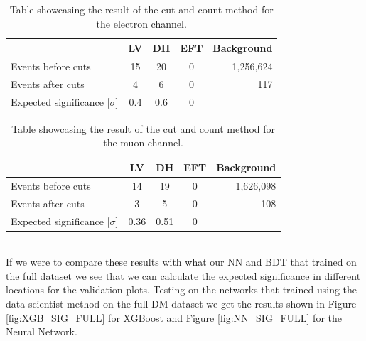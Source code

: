 \documentclass[14pt, a4paper]{book}
\begin{document}
\begin{table}[!h]
    \centering
    \begin{tabular}{l|c|c|c|r}\midrule\midrule
                                          & LV  & DH  & EFT & Background \\\midrule
         Events before cuts               & 15  & 20  & 0   & 1,256,624    \\
         Events after cuts                & 4   & 6   & 0   & 117 \\
         Expected significance [$\sigma$] & 0.4 & 0.6 & 0   & \\\midrule\midrule
    \end{tabular}
    \caption[Cut and count significance ee]{Table showcasing the result of the cut and count method for the electron channel.}
    \label{tab:cutsigee}
\end{table}
\begin{table}[!h]
    \centering
    \begin{tabular}{l|c|c|c|r}\midrule\midrule
                                          & LV  & DH  & EFT & Background \\\midrule
         Events before cuts               & 14  & 19  & 0   & 1,626,098    \\
         Events after cuts                & 3   & 5   & 0   & 108 \\
         Expected significance [$\sigma$] & 0.36 & 0.51 & 0   & \\\midrule\midrule
    \end{tabular}
    \caption[Cut and count significance uu]{Table showcasing the result of the cut and count method for the muon channel.}
    \label{tab:cutsiguu}
\end{table}
\\If we were to compare these results with what our NN and BDT that trained on the full dataset we see that we can calculate the expected significance in different locations for the validation plots. Testing on the networks that trained using the data scientist method on the full DM dataset we get the results shown in Figure \ref{fig:XGB_SIG_FULL} for XGBoost and Figure \ref{fig:NN_SIG_FULL} for the Neural Network.
\end{document}
